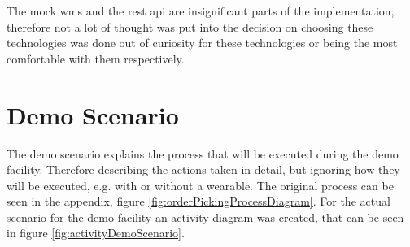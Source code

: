 The mock \gls{wms} and the \gls{rest} \gls{api} are insignificant parts of the implementation, therefore not a lot of thought was put into the decision on choosing these technologies was done out of curiosity for these technologies or being the most comfortable with them respectively.

\section{Demo Scenario}\label{sec:demoScenario}
The demo scenario explains the process that will be executed during the demo facility. Therefore describing the actions taken in detail, but ignoring how they will be executed, e.g. with or without a wearable. The original process can be seen in the appendix, figure \ref{fig:orderPickingProcessDiagram}. For the actual scenario for the demo facility an activity diagram was created, that can be seen in figure \ref{fig:activityDemoScenario}. 

